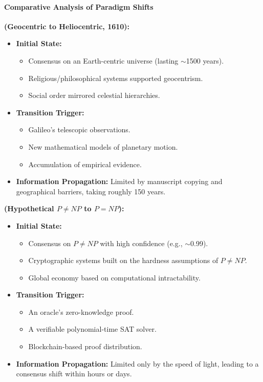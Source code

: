 \documentclass[11pt]{article}
\begin{document}
\paragraph{Comparative Analysis of Paradigm Shifts}
\textbf{(Geocentric to Heliocentric, 1610):}
\begin{itemize}
    \item \textbf{Initial State:} 
    \begin{itemize}
        \item Consensus on an Earth-centric universe (lasting $\sim$1500 years).
        \item Religious/philosophical systems supported geocentrism.
        \item Social order mirrored celestial hierarchies.
    \end{itemize}
    \item \textbf{Transition Trigger:} 
    \begin{itemize}
        \item Galileo's telescopic observations.
        \item New mathematical models of planetary motion.
        \item Accumulation of empirical evidence.
    \end{itemize}
    \item \textbf{Information Propagation:} Limited by manuscript copying and geographical barriers, taking roughly 150 years.
\end{itemize}

\textbf{(Hypothetical $P \neq NP$ to $P=NP$):}
\begin{itemize}
    \item \textbf{Initial State:} 
    \begin{itemize}
        \item Consensus on $P \neq NP$ with high confidence (e.g., $\sim$0.99).
        \item Cryptographic systems built on the hardness assumptions of $P \neq NP$.
        \item Global economy based on computational intractability.
    \end{itemize}
    \item \textbf{Transition Trigger:} 
    \begin{itemize}
        \item An oracle's zero-knowledge proof.
        \item A verifiable polynomial-time SAT solver.
        \item Blockchain-based proof distribution.
    \end{itemize}
    \item \textbf{Information Propagation:} Limited only by the speed of light, leading to a consensus shift within hours or days.
\end{itemize}
\end{document}
